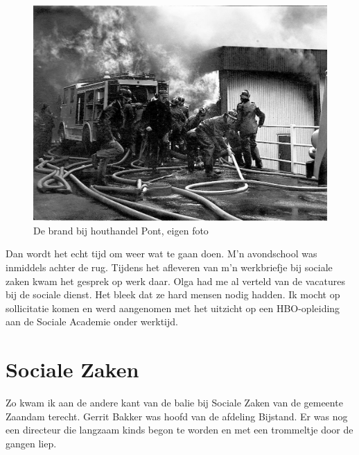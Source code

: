 \documentclass[12pt,twoside, openright]{memoir}
\begin{document}
\begin{figure}
\centering
\includegraphics[width=\textwidth]{img/brandpont_00021}
\caption*{\footnotesize De brand bij houthandel Pont, eigen foto}
\end{figure}

Dan wordt het echt tijd om weer wat te gaan doen. M'n avondschool was inmiddels achter de rug. Tijdens het afleveren van m'n werkbriefje bij sociale zaken kwam het gesprek op werk daar. Olga had me al verteld van de vacatures bij de sociale dienst. Het bleek dat ze hard mensen nodig hadden. Ik mocht op sollicitatie komen en werd aangenomen met het uitzicht op een HBO-opleiding aan de Sociale Academie onder werktijd. 

\section*{Sociale Zaken} %
\label{cha:socialezaken}

Zo kwam ik aan de andere kant van de balie bij Sociale Zaken van de gemeente Zaandam terecht. Gerrit Bakker was hoofd van de afdeling Bijstand. Er was nog een directeur die langzaam kinds begon te worden en met een trommeltje door de gangen liep. 
\end{document}
